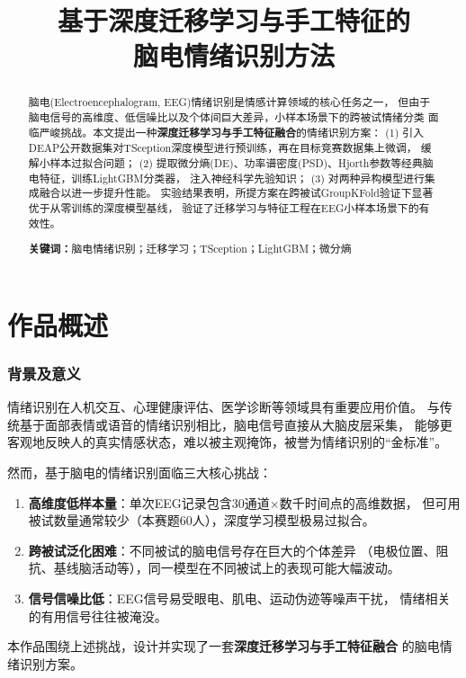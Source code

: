 \documentclass[12pt,a4paper]{ctexrep}
\title{\textbf{基于深度迁移学习与手工特征的\\脑电情绪识别方法}}
\begin{document}
\maketitle

\tableofcontents

\begin{abstract}
脑电(Electroencephalogram, EEG)情绪识别是情感计算领域的核心任务之一，
但由于脑电信号的高维度、低信噪比以及个体间巨大差异，小样本场景下的跨被试情绪分类
面临严峻挑战。本文提出一种\textbf{深度迁移学习与手工特征融合}的情绪识别方案：
(1) 引入DEAP公开数据集对TSception深度模型进行预训练，再在目标竞赛数据集上微调，
缓解小样本过拟合问题；
(2) 提取微分熵(DE)、功率谱密度(PSD)、Hjorth参数等经典脑电特征，训练LightGBM分类器，
注入神经科学先验知识；
(3) 对两种异构模型进行集成融合以进一步提升性能。
实验结果表明，所提方案在跨被试GroupKFold验证下显著优于从零训练的深度模型基线，
验证了迁移学习与特征工程在EEG小样本场景下的有效性。

\textbf{关键词：}脑电情绪识别；迁移学习；TSception；LightGBM；微分熵
\end{abstract}

\chapter{作品概述}

\subsection{背景及意义}

情绪识别在人机交互、心理健康评估、医学诊断等领域具有重要应用价值。
与传统基于面部表情或语音的情绪识别相比，脑电信号直接从大脑皮层采集，
能够更客观地反映人的真实情感状态，难以被主观掩饰，被誉为情绪识别的``金标准''。

然而，基于脑电的情绪识别面临三大核心挑战：
\begin{enumerate}
    \item \textbf{高维度低样本量}：单次EEG记录包含30通道×数千时间点的高维数据，
          但可用被试数量通常较少（本赛题60人），深度学习模型极易过拟合。
    \item \textbf{跨被试泛化困难}：不同被试的脑电信号存在巨大的个体差异
          （电极位置、阻抗、基线脑活动等），同一模型在不同被试上的表现可能大幅波动。
    \item \textbf{信号信噪比低}：EEG信号易受眼电、肌电、运动伪迹等噪声干扰，
          情绪相关的有用信号往往被淹没。
\end{enumerate}

本作品围绕上述挑战，设计并实现了一套\textbf{深度迁移学习与手工特征融合}
的脑电情绪识别方案。
\end{document}
